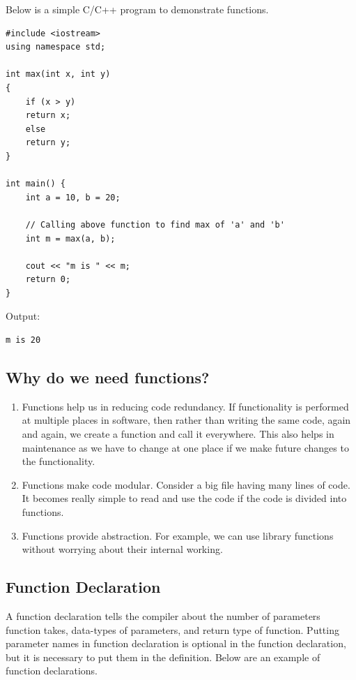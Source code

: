\documentclass{book}
\begin{document}
Below is a simple C/C++ program to demonstrate functions.

\begin{lstlisting}
#include <iostream>
using namespace std;
  
int max(int x, int y) 
{ 
	if (x > y) 
	return x; 
	else
	return y; 
} 
  
int main() {
	int a = 10, b = 20; 

	// Calling above function to find max of 'a' and 'b' 
	int m = max(a, b); 

	cout << "m is " << m; 
	return 0; 
} 
\end{lstlisting}

Output:

\begin{verbatim}
m is 20
\end{verbatim}

\subsection{Why do we need functions?}

\begin{enumerate}
	\item Functions help us in reducing code redundancy. If functionality is performed at multiple places in software, then rather than writing the same code, again and again, we create a function and call it everywhere. This also helps in maintenance as we have to change at one place if we make future changes to the functionality.
\item Functions make code modular. Consider a big file having many lines of code. It becomes really simple to read and use the code if the code is divided into functions.
\item Functions provide abstraction. For example, we can use library functions without worrying about their internal working.
\end{enumerate}

\subsection{Function Declaration}

A function declaration tells the compiler about the number of parameters function takes, data-types of parameters, and return type of function. Putting parameter names in function declaration is optional in the function declaration, but it is necessary to put them in the definition. Below are an example of function declarations. 
\end{document}
